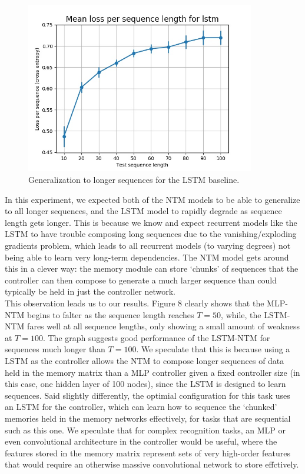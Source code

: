 \documentclass{amsart}
\numberwithin{equation}{section}
\theoremstyle{definition}
\theoremstyle{remark}
\begin{document}
\begin{figure}[h]
\includegraphics[width=100mm]{outputs/lstm_loss-eval}
\caption{Generalization to longer sequences for the LSTM baseline.}
\label{Figure 10}
\end{figure}

In this experiment, we expected both of the NTM models to be able to
generalize to all longer sequences, and the LSTM model to rapidly
degrade as sequence length gets longer. This is because we know
and expect recurrent models like the LSTM to have trouble composing
long sequences due to the vanishing/exploding gradients problem,
which leads to all recurrent models (to varying degrees) not being
able to learn very long-term dependencies. The NTM model gets around
this in a clever way: the memory module can store `chunks' of sequences
that the controller can then compose to generate a much larger sequence
than could typically be held in just the controller network.\\

This observation leads us to our results. Figure 8 clearly shows that
the MLP-NTM begins to falter as the sequence length reaches $T=50$,
while, the LSTM-NTM fares well at all sequence lengths, only showing
a small amount of weakness at $T=100$. The graph suggests good performance
of the LSTM-NTM for sequences much longer than $T=100$. We speculate
that this is because using a LSTM as the controller allows the NTM to
compose longer sequences of data held in the memory matrix than a MLP
controller given a fixed controller size (in this case, one hidden
layer of 100 nodes), since the LSTM is designed to learn sequences.
Said slightly differently, the optimial configuration for this task
uses an LSTM for the controller, which can learn how to sequence the
`chunked' memories held in the memory networks effectively, for
tasks that are sequential such as this one. We speculate that for
complex recognition tasks, an MLP or even convolutional architecture
in the controller would be useful, where the features stored in the
memory matrix represent sets of very high-order features that would
require an otherwise massive convolutional network to store effctively.\\
\end{document}
